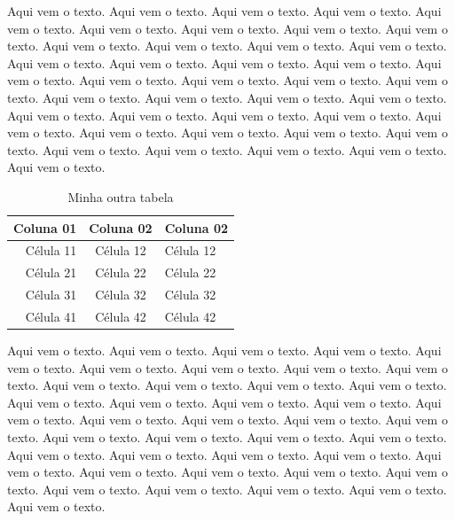\documentclass[12pt,a4paper]{article}
\begin{document}
	Aqui vem o texto. Aqui vem o texto. Aqui vem o texto. Aqui vem o texto. Aqui vem o texto. Aqui vem o texto. Aqui vem o texto. Aqui vem o texto. Aqui vem o texto. Aqui vem o texto. Aqui vem o texto. Aqui vem o texto. Aqui vem o texto. Aqui vem o texto. Aqui vem o texto. Aqui vem o texto. Aqui vem o texto. Aqui vem o texto. Aqui vem o texto. Aqui vem o texto. Aqui vem o texto. Aqui vem o texto. Aqui vem o texto. Aqui vem o texto. Aqui vem o texto. Aqui vem o texto. Aqui vem o texto. Aqui vem o texto. Aqui vem o texto. Aqui vem o texto. Aqui vem o texto. Aqui vem o texto. Aqui vem o texto. Aqui vem o texto. Aqui vem o texto. Aqui vem o texto. Aqui vem o texto. Aqui vem o texto. Aqui vem o texto. Aqui vem o texto.
	
	\begin{table}[htb]
		\centering
		\begin{tabular}{|r|c|l|}
			\hline
			Coluna 01 & Coluna 02 & Coluna 02 \\ \hline
			Célula 11 & Célula 12 & Célula 12 \\
			Célula 21 & Célula 22 & Célula 22 \\
			Célula 31 & Célula 32 & Célula 32 \\
			Célula 41 & Célula 42 & Célula 42 \\ \hline
		\end{tabular}
		\caption{Minha outra tabela}
		\label{minha_tabela2}
	\end{table}
	
	Aqui vem o texto. Aqui vem o texto. Aqui vem o texto. Aqui vem o texto. Aqui vem o texto. Aqui vem o texto. Aqui vem o texto. Aqui vem o texto. Aqui vem o texto. Aqui vem o texto. Aqui vem o texto. Aqui vem o texto. Aqui vem o texto. Aqui vem o texto. Aqui vem o texto. Aqui vem o texto. Aqui vem o texto. Aqui vem o texto. Aqui vem o texto. Aqui vem o texto. Aqui vem o texto. Aqui vem o texto. Aqui vem o texto. Aqui vem o texto. Aqui vem o texto. Aqui vem o texto. Aqui vem o texto. Aqui vem o texto. Aqui vem o texto. Aqui vem o texto. Aqui vem o texto. Aqui vem o texto. Aqui vem o texto. Aqui vem o texto. Aqui vem o texto. Aqui vem o texto. Aqui vem o texto. Aqui vem o texto. Aqui vem o texto. Aqui vem o texto.	
	
	\newpage
	
	
\end{document}
